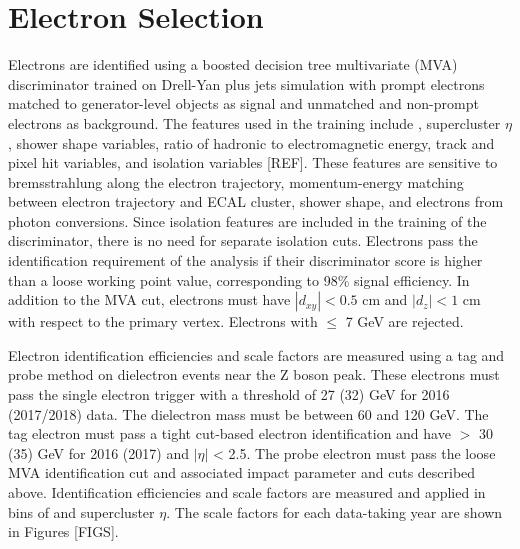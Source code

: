 \section{Electron Selection}
Electrons are identified using a boosted decision tree multivariate (MVA) discriminator trained on Drell-Yan plus jets simulation 
with prompt electrons matched to generator-level objects as signal and unmatched and non-prompt electrons as background. The features 
used in the training include \pt, supercluster $\eta$, shower shape variables, ratio of hadronic to electromagnetic energy, track and 
pixel hit variables, and isolation variables [REF]. These features are sensitive to bremsstrahlung along the electron trajectory, 
momentum-energy matching between electron trajectory and ECAL cluster, shower shape, and electrons from photon conversions.
Since isolation features are included in the training of the discriminator, there is no need for separate isolation cuts. 
Electrons pass the identification requirement of the \hzg analysis if their discriminator score is higher than a loose working point 
value, corresponding to 98\% signal efficiency. In addition to the MVA cut, electrons must have $|d_{xy}| < 0.5$ cm and $|d_{z}| < 1$ cm
with respect to the primary vertex. Electrons with \pt $\leq$ 7 GeV are rejected. 

Electron identification efficiencies and scale factors are measured using a tag and probe method on dielectron events near the 
Z boson peak. These electrons must pass the single electron trigger with a \pt threshold of 27 (32) GeV for 2016 (2017/2018) data. 
The dielectron mass must be between 60 and 120 GeV. The tag electron must pass a tight cut-based electron identification and have 
\pt $>$ 30 (35) GeV for 2016 (2017) and $|\eta|$ < 2.5. The probe electron must pass the loose MVA identification cut and associated 
impact parameter and \pt cuts described above. Identification efficiencies and scale factors are measured and applied in bins of 
\pt and supercluster $\eta$. The scale factors for each data-taking year are shown in Figures [FIGS]. 

